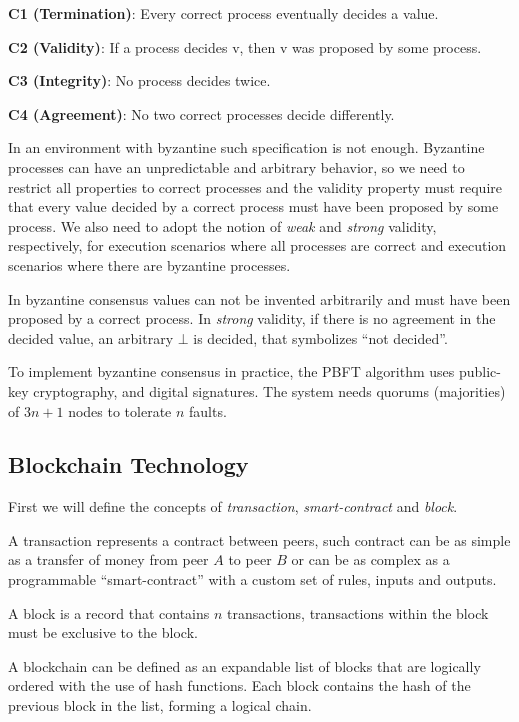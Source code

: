\documentclass[10pt,journal,compsoc]{IEEEtran}
\begin{document}
	\begin{description}
		\item \textbf{C1 (Termination)}: Every correct process eventually decides a value.
		\item \textbf{C2 (Validity)}: If a process decides v, then v was proposed by some process.
		\item \textbf{C3 (Integrity)}: No process decides twice.
		\item \textbf{C4 (Agreement)}: No two correct processes decide differently.
	\end{description}

	In an environment with byzantine such specification is not enough. Byzantine processes can have an unpredictable and arbitrary behavior, so we need to restrict all properties to correct processes and the validity property must require that every value decided by a correct process must have been proposed by some process.
	We also need to adopt the notion of \textit{weak} and \textit{strong} validity, respectively, for execution scenarios where all processes are correct and execution scenarios where there are byzantine processes. 
	
	In byzantine consensus values can not be invented arbitrarily and must have been proposed by a correct process. In  \textit{strong} validity, if there is no agreement in the decided value, an arbitrary $\bot$ is decided, that symbolizes “not decided”.

	To implement byzantine consensus in practice, the PBFT\cite{castro1999practical} algorithm uses public-key cryptography, and digital signatures. The system needs quorums (majorities) of $3n+1$ nodes to tolerate $n$ faults. 

	\subsection{Blockchain Technology}
	First we will define the concepts of \textit{transaction}, \textit{smart-contract} and \textit{block}.
	
	A transaction represents a contract between peers, such contract can be as simple as a transfer of money from peer $A$ to peer $B$ or can be as complex as a programmable “smart-contract” with a custom set of rules, inputs and outputs.
	
	A block is a record that contains $n$ transactions, transactions within the block must be exclusive to the block. 

	A blockchain can be defined as an expandable list of blocks that are logically ordered with the use of hash functions. Each block contains the hash of the previous block in the list, forming a logical chain.
\end{document}
